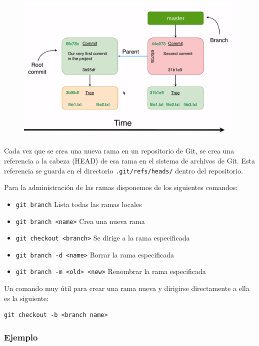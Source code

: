 \begin{figure}[H]
    \centering
    \includegraphics[scale=0.4]{Github/Git_f6.png}
\end{figure}


Cada vez que se crea una nueva rama en un repositorio de Git, se crea una referencia a la cabeza (HEAD) de esa rama en el sistema de archivos de Git. Esta referencia se guarda en el directorio \texttt{.git/refs/heads/} dentro del repositorio.


Para la administración de las ramas disponemos de los siguientes comandos:

 \begin{itemize}
     \item \texttt{git branch} Lista todas las ramas locales
     \item \texttt{git branch <name>} Crea una nueva rama
     \item \texttt{git checkout <branch>} Se dirige a la rama especificada
     \item \texttt{git branch -d <name>} Borrar la rama especificada
     \item \texttt{git branch -m <old> <new>} Renombrar la rama especificada
 \end{itemize}

 Un comando muy útil para crear una rama nueva y dirigirse directamente a ella es la siguiente:

 \begin{verbatim}
git checkout -b <branch name>
 \end{verbatim}

\subsubsection*{Ejemplo}

